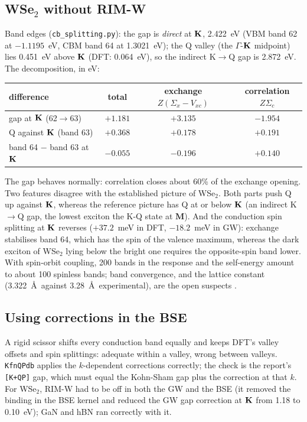 \subsection{WSe$_2$ without RIM-W}
Band edges (\texttt{cb\_splitting.py}): the gap is \emph{direct} at $\mathbf{K}$, 2.422~eV
(VBM band 62 at $-1.1195$~eV, CBM band 64 at 1.3021~eV); the Q valley (the
$\Gamma$-$\mathbf{K}$ midpoint) lies 0.451~eV above $\mathbf{K}$ (DFT: 0.064~eV), so the
indirect K$\to$Q gap is 2.872~eV. The decomposition, in eV:
\begin{center}\small
\begin{tabular}{lccc}
\toprule
difference & total & exchange $Z(\Sigma_x-V_{xc})$ & correlation $Z\Sigma_c$\\
\midrule
gap at $\mathbf{K}$ (62$\to$63) & $+1.181$ & $+3.135$ & $-1.954$\\
Q against $\mathbf{K}$ (band 63) & $+0.368$ & $+0.178$ & $+0.191$\\
band 64 $-$ band 63 at $\mathbf{K}$ & $-0.055$ & $-0.196$ & $+0.140$\\
\bottomrule
\end{tabular}
\end{center}
The gap behaves normally: correlation closes about 60\% of the exchange opening.
Two features disagree with the established picture of WSe$_2$. Both parts push
Q up against $\mathbf{K}$, whereas the reference picture has Q at or below $\mathbf{K}$ (an
indirect K$\to$Q gap, the lowest exciton the K-Q state at $\mathbf{M}$). And the
conduction spin splitting at $\mathbf{K}$ reverses ($+37.2$~meV in DFT, $-18.2$~meV in
GW): exchange stabilises band 64, which has the spin of the valence maximum,
whereas the dark exciton of WSe$_2$ lying below the bright one requires the
opposite-spin band lower. With spin-orbit coupling, 200 bands in the response
and the self-energy amount to about 100 spinless bands; band convergence, and
the lattice constant (3.322~\AA\ against 3.28~\AA\ experimental), are the open
suspects .

\subsection{Using corrections in the BSE}
A rigid scissor shifts every conduction band equally and keeps DFT's valley
offsets and spin splittings: adequate within a valley, wrong between valleys.
\texttt{KfnQPdb} applies the $k$-dependent corrections correctly; the check is
the report's \texttt{[K+QP]} gap, which must equal the Kohn-Sham gap plus the
correction at that $k$. For WSe$_2$, RIM-W had to be off in both the GW and the
BSE (it removed the binding in the BSE kernel and reduced the GW gap correction
at $\mathbf{K}$ from 1.18 to 0.10~eV); GaN and hBN ran correctly with it.

